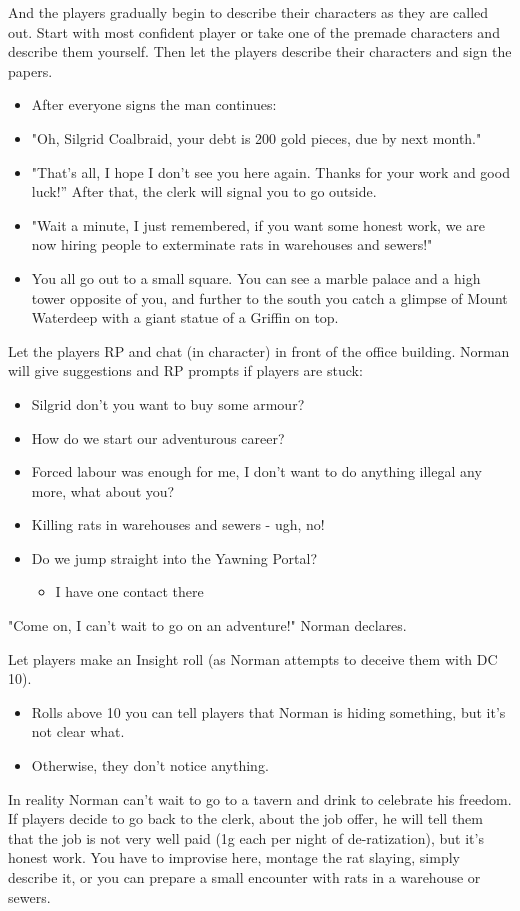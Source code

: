 \documentclass[10pt,onecolumn,twoside,openany,bg=full,layout=true]{dndbook}
\begin{document}
And the players gradually begin to describe their characters as they are called out.
Start with most confident player or take one of the premade characters and describe them yourself.
Then let the players describe their characters and sign the papers.
\begin{DndReadAloud}
\begin{itemize}
  \item After everyone signs the man continues:
  \item "Oh, Silgrid Coalbraid, your debt is 200 gold pieces, due by next month."
  \item "That's all, I hope I don't see you here again. Thanks for your work and good luck!” After that, the clerk will signal you to go outside.
  \item "Wait a minute, I just remembered, if you want some honest work, we are now hiring people to exterminate rats in warehouses and sewers!"
  \item You all go out to a small square.
You can see a marble palace and a high tower opposite of you, and further to the south you catch a glimpse of Mount Waterdeep with a giant statue of a Griffin on top.
\end{itemize}

\end{DndReadAloud}
Let the players RP and chat (in character) in front of the office building.
Norman will give suggestions and RP prompts if players are stuck:
\begin{itemize}
  \item Silgrid don't you want to buy some armour?
  \item How do we start our adventurous career?
  \item Forced labour was enough for me, I don’t want to do anything illegal any more, what about you?
  \item Killing rats in warehouses and sewers - ugh, no!
  \item Do we jump straight into the Yawning Portal?
  \begin{itemize}
    \item I have one contact there
  \end{itemize}
\end{itemize}
\begin{DndReadAloud}
"Come on, I can't wait to go on an adventure!" Norman declares.
\end{DndReadAloud}
Let players make an Insight roll (as Norman attempts to deceive them with DC 10).
\begin{itemize}
\item Rolls above 10 you can tell players that Norman is hiding something, but it's not clear what.
\item Otherwise, they don't notice anything.
\end{itemize}
In reality Norman can't wait to go to a tavern and drink to celebrate his freedom.
If players decide to go back to the clerk, about the job offer, he will tell them that the job is not very well paid (1g each per night of de-ratization), but it's honest work.
You have to improvise here, montage the rat slaying, simply describe it, or you can prepare a small encounter with rats in a warehouse or sewers.
\end{document}
